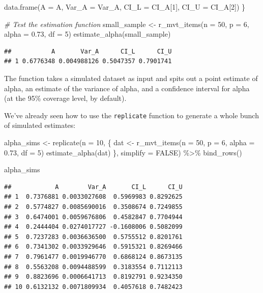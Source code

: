 \documentclass[
]{book}
\newenvironment{Shaded}{\begin{snugshade}}{\end{snugshade}}
\newcommand{\AttributeTok}[1]{\textcolor[rgb]{0.77,0.63,0.00}{#1}}
\newcommand{\CommentTok}[1]{\textcolor[rgb]{0.56,0.35,0.01}{\textit{#1}}}
\newcommand{\ConstantTok}[1]{\textcolor[rgb]{0.00,0.00,0.00}{#1}}
\newcommand{\DecValTok}[1]{\textcolor[rgb]{0.00,0.00,0.81}{#1}}
\newcommand{\FloatTok}[1]{\textcolor[rgb]{0.00,0.00,0.81}{#1}}
\newcommand{\FunctionTok}[1]{\textcolor[rgb]{0.00,0.00,0.00}{#1}}
\newcommand{\NormalTok}[1]{#1}
\newcommand{\OtherTok}[1]{\textcolor[rgb]{0.56,0.35,0.01}{#1}}
\newcommand{\SpecialCharTok}[1]{\textcolor[rgb]{0.00,0.00,0.00}{#1}}
\begin{document}
\begin{Shaded}
\begin{Highlighting}[]
  \FunctionTok{data.frame}\NormalTok{(}\AttributeTok{A =}\NormalTok{ A, }\AttributeTok{Var\_A =}\NormalTok{ Var\_A, }\AttributeTok{CI\_L =}\NormalTok{ CI\_A[}\DecValTok{1}\NormalTok{], }\AttributeTok{CI\_U =}\NormalTok{ CI\_A[}\DecValTok{2}\NormalTok{])}
\NormalTok{\}}

\CommentTok{\# Test the estimation function}
\NormalTok{small\_sample }\OtherTok{\textless{}{-}} \FunctionTok{r\_mvt\_items}\NormalTok{(}\AttributeTok{n =} \DecValTok{50}\NormalTok{, }\AttributeTok{p =} \DecValTok{6}\NormalTok{, }\AttributeTok{alpha =} \FloatTok{0.73}\NormalTok{, }\AttributeTok{df =} \DecValTok{5}\NormalTok{)}
\FunctionTok{estimate\_alpha}\NormalTok{(small\_sample)}
\end{Highlighting}
\end{Shaded}

\begin{verbatim}
##           A       Var_A      CI_L      CI_U
## 1 0.6776348 0.004988126 0.5047357 0.7901741
\end{verbatim}

The function takes a simulated dataset as input and spits out a point estimate of alpha, an estimate of the variance of alpha, and a confidence interval for alpha (at the 95\% coverage level, by default).

We've already seen how to use the \texttt{replicate} function to generate a whole bunch of simulated estimates:

\begin{Shaded}
\begin{Highlighting}[]
\NormalTok{alpha\_sims }\OtherTok{\textless{}{-}} 
  \FunctionTok{replicate}\NormalTok{(}\AttributeTok{n =} \DecValTok{10}\NormalTok{, \{}
\NormalTok{    dat }\OtherTok{\textless{}{-}} \FunctionTok{r\_mvt\_items}\NormalTok{(}\AttributeTok{n =} \DecValTok{50}\NormalTok{, }\AttributeTok{p =} \DecValTok{6}\NormalTok{, }\AttributeTok{alpha =} \FloatTok{0.73}\NormalTok{, }\AttributeTok{df =} \DecValTok{5}\NormalTok{)}
    \FunctionTok{estimate\_alpha}\NormalTok{(dat)}
\NormalTok{  \}, }\AttributeTok{simplify =} \ConstantTok{FALSE}\NormalTok{) }\SpecialCharTok{\%\textgreater{}\%}
  \FunctionTok{bind\_rows}\NormalTok{()}

\NormalTok{alpha\_sims}
\end{Highlighting}
\end{Shaded}

\begin{verbatim}
##            A        Var_A       CI_L      CI_U
## 1  0.7376881 0.0033027608  0.5969983 0.8292625
## 2  0.5774827 0.0085690016  0.3508674 0.7249855
## 3  0.6474001 0.0059676806  0.4582847 0.7704944
## 4  0.2444404 0.0274017727 -0.1608006 0.5082099
## 5  0.7237283 0.0036636500  0.5755512 0.8201761
## 6  0.7341302 0.0033929646  0.5915321 0.8269466
## 7  0.7961477 0.0019946770  0.6868124 0.8673135
## 8  0.5563208 0.0094488599  0.3183554 0.7112113
## 9  0.8823696 0.0006641713  0.8192791 0.9234350
## 10 0.6132132 0.0071809934  0.4057618 0.7482423
\end{verbatim}
\end{document}

